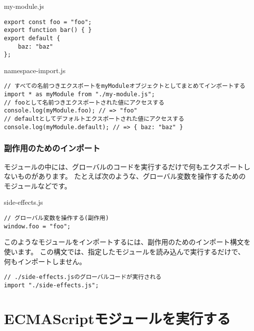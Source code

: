 \begin{listtitle}
my-module.js
\end{listtitle}
\begin{lstlisting}
export const foo = "foo";
export function bar() { }
export default {
    baz: "baz"
};
\end{lstlisting}
\listend

\begin{listtitle}
namespace-import.js
\end{listtitle}
\begin{lstlisting}
// すべての名前つきエクスポートをmyModuleオブジェクトとしてまとめてインポートする
import * as myModule from "./my-module.js";
// fooとして名前つきエクスポートされた値にアクセスする
console.log(myModule.foo); // => "foo"
// defaultとしてデフォルトエクスポートされた値にアクセスする
console.log(myModule.default); // => { baz: "baz" }
\end{lstlisting}
\listend

\hypertarget{import-for-side-effect}{%
\subsubsection{副作用のためのインポート}\label{import-for-side-effect}}

モジュールの中には、グローバルのコードを実行するだけで何もエクスポートしないものがあります。
たとえば次のような、グローバル変数を操作するためのモジュールなどです。

\begin{listtitle}
side-effects.js
\end{listtitle}
\begin{lstlisting}
// グローバル変数を操作する(副作用)
window.foo = "foo";
\end{lstlisting}
\listend

このようなモジュールをインポートするには、副作用のためのインポート構文を使います。
この構文では、指定したモジュールを読み込んで実行するだけで、何もインポートしません。\enlargethispage{\baselineskip}

\begin{lstlisting}
// ./side-effects.jsのグローバルコードが実行される
import "./side-effects.js";
\end{lstlisting}

\hypertarget{run-es-modules}{%
\section{ECMAScriptモジュールを実行する}\label{run-es-modules}}

